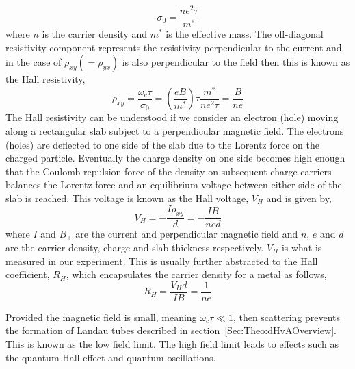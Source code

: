 \begin{equation}
    \sigma_0 = \frac{ne^2\tau}{m^*}
\end{equation}
where $n$ is the carrier density and $m^*$ is the effective mass. The off-diagonal resistivity component represents the resistivity perpendicular to the current and in the case of $\rho_{xy} (=\rho_{yx})$ is also perpendicular to the field then this is known as the Hall resistivity,
 \begin{equation}
     \rho_{xy} = \frac{\omega_c \tau}{\sigma_0} = \left(\frac{eB}{m^*}\right)\tau\frac{m^*}{ne^2\tau} = \frac{B}{ne}
 \end{equation}
The Hall resistivity can be understood if we consider an electron (hole) moving along a rectangular slab subject to a perpendicular magnetic field. The electrons (holes) are deflected to one side of the slab due to the Lorentz force on the charged particle. Eventually the charge density on one side becomes high enough that the Coulomb repulsion force of the density on subsequent charge carriers balances the Lorentz force and an equilibrium voltage between either side of the slab is reached. This voltage is known as the Hall voltage, $V_H$ and is given by,
\begin{equation}
    V_H = -\frac{I\rho_{xy}}{d} = -\frac{IB}{ned}
\end{equation}
where $I$ and $B_{\perp}$ are the current and perpendicular magnetic field and $n$, $e$ and $d$ are the carrier density, charge and slab thickness respectively. $V_H$ is what is measured in our experiment. This is usually further abstracted to the Hall coefficient, $R_H$, which encapsulates the carrier density for a metal as follows,
\begin{equation}
    R_H = \frac{V_H d}{IB} = \frac{1}{ne}
\end{equation}

Provided the magnetic field is small, meaning $\omega_c \tau \ll 1$, then scattering prevents the formation of Landau tubes described in section~\ref{Sec:Theo:dHvAOverview}. This is known as the low field limit. The high field limit leads to effects such as the quantum Hall effect and quantum oscillations.

% 

